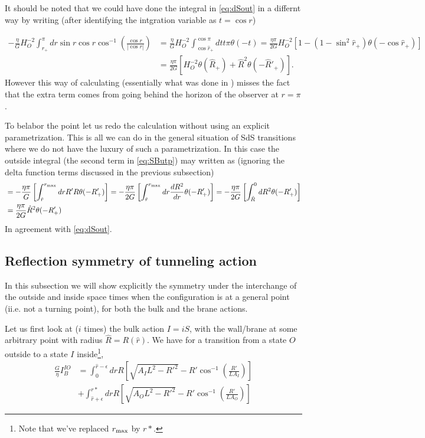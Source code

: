 \documentclass[a4paper,11pt]{article}
\numberwithin{equation}{section}
\newcommand{\citep}{\cite}
\numberwithin{equation}{section}
\begin{document}
It should be noted that we could have done the integral in \eqref{eq:dSout}
in a differnt way by writing (after identifying the intgration variable
as $t=\cos r$)

\begin{align*}
-\frac{\eta}{G}H_{O}^{-2}\int_{\hat{r}_{+}}^{\pi}dr\sin r\cos r\cos^{-1}\left(\frac{\cos r}{|\cos r|}\right) & =\frac{\eta}{G}H_{O}^{-2}\int_{\cos\hat{r}_{+}}^{\cos\pi}dtt\pi\theta\left(-t\right)=\frac{\eta\pi}{2G}H_{O}^{-2}\left[1-\left(1-\sin^{2}\hat{r}_{+}\right)\theta\left(-\cos\hat{r}_{+}\right)\right]\\
 & =\frac{\eta\pi}{2G}\left[H_{O}^{-2}\theta\left(\hat{R}_{+}\right)+\hat{R}^{2}\theta\left(-\hat{R}'_{+}\right)\right].
\end{align*}
However this way of calculating (essentially what was done in \citep{DeAlwis:2019rxg})
misses the fact that the extra term comes from going behind the horizon
of the observer at $r=\pi$ . 

To belabor the point let us redo the calculation without using an
explicit parametrization. This is all we can do in the general situation
of SdS transitions where we do not have the luxury of such a parametrization.
In this case the outside integral (the second term in \eqref{eq:SButp})
may written as (ignoring the delta function terms discussed in the previous subsection)
\begin{align*}
 & =-\frac{\eta\pi}{G}\left[\int_{\hat{r}}^{r_{\rm max}}drR'R\theta(-R_{+}')\right]=-\frac{\eta\pi}{2G}\left[\int_{\hat{r}}^{r_{\rm max}}dr\frac{dR^{2}}{dr}\theta(-R_{+}')\right]=-\frac{\eta\pi}{2G}\left[\int_{\hat{R}}^{0}dR^{2}\theta(-R_{+}')\right]\\
 & =\frac{\eta\pi}{2G}\hat{R}^{2}\theta(-R_{+}')
\end{align*}
In agreement with \eqref{eq:dSout}.



\subsection{Reflection symmetry of tunneling action}\label{subsec:Reflection-symmetry-of}
In this subsection we will show explicitly the symmetry under the interchange of the outside and inside space times when the configuration is at a general point (ii.e. not a turning point), for both the bulk and the brane actions.

Let us first look at ($i$ times) the bulk action $I=iS$, with the
wall/brane at some arbitrary point with radius $\hat{R}=R(\hat{r})$.
We have for a transition from a state $O$ outside to a state $I$
inside\footnote{Note that we've replaced $r_{\rm max}$ by $r*$.},
\begin{align}
\frac{G}{\eta}I_{B}^{IO} & =\int_{0}^{\hat{r}-\epsilon}drR\left[\sqrt{A_{I}L^{2}-R'^{2}}-R'\cos^{-1}\left(\frac{R'}{LA_{I}}\right)\right]\nonumber \\
 & +\int_{\hat r+\epsilon}^{r*}drR\left[\sqrt{A_{O}L^{2}-R'^{2}}-R'\cos^{-1}\left(\frac{R'}{LA_{O}}\right)\right]\label{eq:IO}
\end{align}
\end{document}

